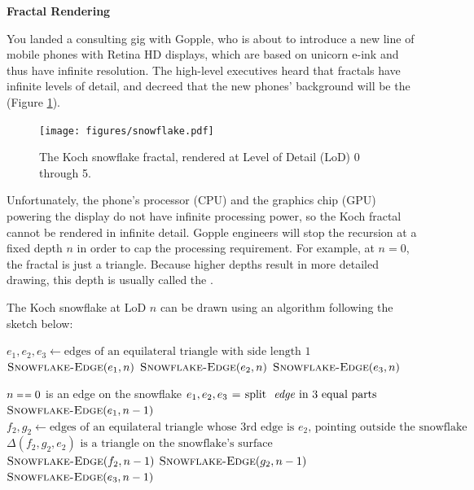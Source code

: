 \documentclass[12pt,twoside]{article}
\begin{document}
\begin{problems}

\problem {} \textbf{Fractal Rendering}

You landed a consulting gig with Gopple, who is about to introduce a new line
of mobile phones with Retina HD displays, which are based on unicorn e-ink and thus
have infinite resolution. The high-level executives heard that fractals have
infinite levels of detail, and decreed that the new phones' background will be
the   (Figure \ref{fig:snowflake}).

\begin{figure}[htbp]
\centering
\texttt{[image: figures/snowflake.pdf]}
\caption{The Koch snowflake fractal, rendered at Level of Detail (LoD) 0 through 5.}
\label{fig:snowflake}
\end{figure}

Unfortunately, the phone's processor (CPU) and the graphics chip (GPU) powering
the display do not have infinite processing power, so the Koch fractal cannot be
rendered in infinite detail. Gopple engineers will stop the recursion at a
fixed depth $n$ in order to cap the processing requirement. 
For example, at $n=0$, the fractal is just a triangle.
Because higher depths result in more detailed drawing, this depth is usually
called the .

The Koch snowflake at LoD $n$ can be drawn using an algorithm following the
sketch below:

\begin{codebox} 
\li $e_1, e_2, e_3 \gets
\textrm{edges of an equilateral triangle with side length }1$
\li $\textnormal{\scshape Snowflake-Edge}(e_1, n)$
\li $\textnormal{\scshape Snowflake-Edge}(e_2, n)$
\li $\textnormal{\scshape Snowflake-Edge}(e_3, n)$
\end{codebox}

\begin{codebox}
\li \If $n \isequal 0$
\li   \Then \textrm{ is an edge on the snowflake}
\li \Else
\li   $e_1, e_2, e_3 \gets \textrm{split \id{edge} in 3 equal parts}$
\li   $\textnormal{\scshape Snowflake-Edge}(e_1, n - 1)$
\li   $f_2, g_2 \gets \textrm{edges of an equilateral triangle whose 3rd edge
is } e_2 \textrm{, pointing outside the snowflake}$
\li   $\textrm{$\Delta(f_2,g_2,e_2)$ is a triangle on the snowflake's surface}$
\li   $\textnormal{\scshape Snowflake-Edge}(f_2, n - 1)$
\li   $\textnormal{\scshape Snowflake-Edge}(g_2, n - 1)$
\li   $\textnormal{\scshape Snowflake-Edge}(e_3, n - 1)$
    \End
\end{codebox}


\end{problems}
\end{document}
